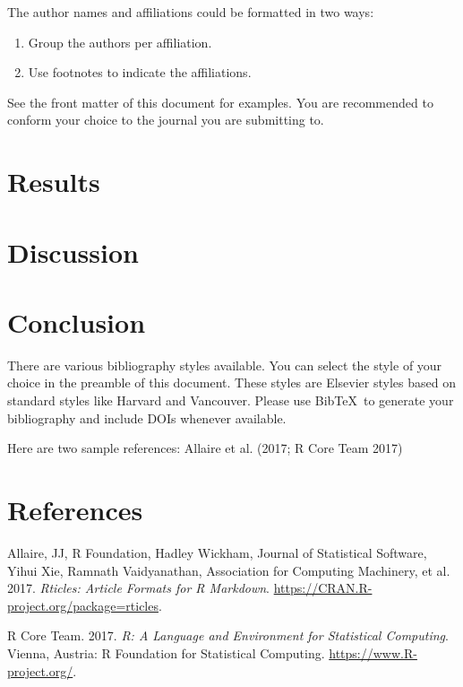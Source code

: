 \documentclass[]{elsarticle} %
\begin{document}
The author names and affiliations could be formatted in two ways:

\begin{enumerate}
\def\labelenumi{(\arabic{enumi})}
\item
  Group the authors per affiliation.
\item
  Use footnotes to indicate the affiliations.
\end{enumerate}

See the front matter of this document for examples. You are recommended
to conform your choice to the journal you are submitting to.

\section{Results}\label{results}

\section{Discussion}\label{discussion}

\section{Conclusion}\label{conclusion}

There are various bibliography styles available. You can select the
style of your choice in the preamble of this document. These styles are
Elsevier styles based on standard styles like Harvard and Vancouver.
Please use BibTeX~to generate your bibliography and include DOIs
whenever available.

Here are two sample references: Allaire et al. (2017; R Core Team 2017)

\section*{References}\label{references.unnumbered}

\hypertarget{refs}{}
\hypertarget{ref-Allaire2017}{}
Allaire, JJ, R Foundation, Hadley Wickham, Journal of Statistical
Software, Yihui Xie, Ramnath Vaidyanathan, Association for Computing
Machinery, et al. 2017. \emph{Rticles: Article Formats for R Markdown}.
\url{https://CRAN.R-project.org/package=rticles}.

\hypertarget{ref-CRAN}{}
R Core Team. 2017. \emph{R: A Language and Environment for Statistical
Computing}. Vienna, Austria: R Foundation for Statistical Computing.
\url{https://www.R-project.org/}.
\end{document}
